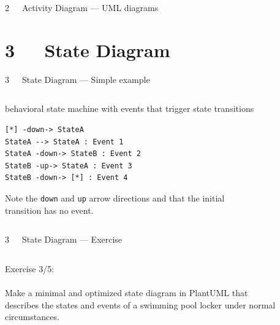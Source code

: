 \documentclass{beamer}
\begin{document}
\begin{frame}{2~~~Activity Diagram — UML diagrams}
\begin{figure}
\def\centering\svgwidth{\textwidth}
\resizebox{!}{.5\textheight}{}
\end{figure} 
\end{frame}



\section{3~~~State Diagram}

\begin{frame}[fragile]{3~~~State Diagram — Simple example}
\begin{columns}
\begin{column}{.5\textwidth}
behavioral \alert{state machine} with \alert{events} that trigger \alert{state} transitions
\begin{verbatim}
[*] -down-> StateA
StateA --> StateA : Event 1
StateA -down-> StateB : Event 2
StateB -up-> StateA : Event 3
StateB -down-> [*] : Event 4
\end{verbatim}
Note the \texttt{down} and \texttt{up} arrow directions and that the initial transition has no event.
\end{column}
\begin{column}{.5\textwidth}
\begin{figure}
\def\centering\svgwidth{\columnwidth}
\resizebox{!}{.8\textheight}{}
\end{figure}
\end{column}
\end{columns}
\end{frame}

\begin{frame}{3~~~State Diagram — Exercise}
\begin{columns}
\begin{column}{.35\textwidth}
Exercise 3/5:
\\\mbox{}\\
Make a minimal and optimized state diagram in PlantUML that describes the states and events of a swimming pool locker under normal circumstances.
\end{column}
\begin{column}{.65\textwidth}
\begin{figure}
\centering
{}
\end{figure}
\end{column}
\end{columns}
\end{frame}
\end{document}
